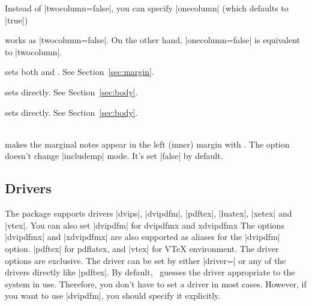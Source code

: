\begin{Options}
  Instead of |twocolumn=false|, you can specify |onecolumn| (which
  defaults to |true|)
\item[onecolumn] works as |twocolumn=false|. On the other hand,
  |onecolumn=false| is equivalent to |twocolumn|. 
\item[twoside] sets both  and .
  See Section~\ref{sec:margin}.
\item[textwidth] sets  directly. See Section~\ref{sec:body}.
\item[textheight] sets  directly. See Section~\ref{sec:body}.
\item[reversemp\OR reversemarginpar]~\\
  makes the marginal notes appear in the left (inner) margin with
  . The option doesn't change |includemp| mode.
  It's set |false| by default.
\end{Options}

\subsection{Drivers}\label{sec:drivers}

The package supports drivers |dvips|, |dvipdfm|, |pdftex|, |luatex|,
|xetex| and |vtex|. You can also set |dvipdfm| for \textsf{dvipdfmx} and
\textsf{xdvipdfmx} The options |dvipdfmx| and |xdvipdfmx| are also supported
as aliases for the |dvipdfm| option.
|pdftex| for \textsf{pdflatex}, and |vtex| for
V\TeX{} environment.
The driver options are exclusive. The driver can be set by either
|driver=| or any of the drivers directly like |pdftex|.
By default, \Gm\ guesses the driver appropriate to the system
in use. Therefore, you don't have to set a driver in most cases.
However, if you want to use |dvipdfm|, you should specify it explicitly.

